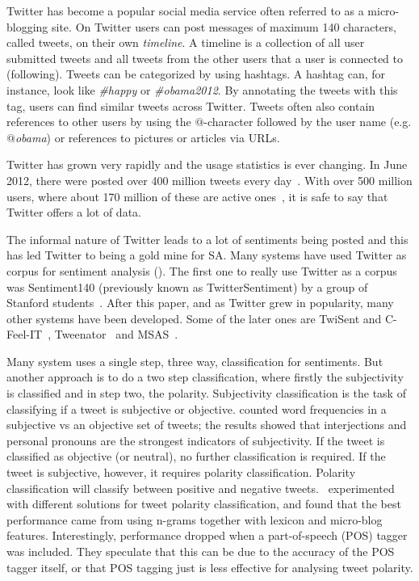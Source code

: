Twitter has become a popular social media service often referred to as a micro-blogging site. On Twitter users can post messages of maximum 140 characters, called tweets, on their own \emph{timeline}. A timeline is a collection of all user submitted tweets and all tweets from the other users that a user is connected to (following). Tweets can be categorized by using hashtags. A hashtag can, for instance, look like \emph{\#happy} or \emph{\#obama2012}. By annotating the tweets with this tag, users can find similar tweets across Twitter. Tweets often also contain references to other users by using the $@$-character followed by the user name (e.g. \emph{$@$obama}) or references to pictures or articles via URLs.

Twitter has grown very rapidly and the usage statistics is ever changing. In June 2012, there were posted over 400 million tweets every day~\citep{site:twitterusage}. With over 500 million users, where about 170 million of these are active ones~\citep{site:users}, it is safe to say that Twitter offers a lot of data.

The informal nature of Twitter leads to a lot of sentiments being posted and this has led Twitter to being a gold mine for SA. Many systems have used Twitter as corpus for sentiment analysis (). The first one to really use Twitter as a corpus was Sentiment140 (previously known as TwitterSentiment) by a group of Stanford students~\citep{article:go}. After this paper, and as Twitter grew in popularity, many other systems have been developed. Some of the later ones are TwiSent and C-Feel-IT~\citep{mukherjee2012twisent}, Tweenator~\citep{saif2012semantic} and MSAS~\citep{chamlertwat2012discovering}.

Many system uses a single step, three way, classification for sentiments. But another approach is to do a two step classification, where firstly the subjectivity is classified and in step two, the polarity. Subjectivity classification is the task of classifying if a tweet is subjective or objective. \cite{article:pak} counted word frequencies in a subjective vs an objective set of tweets; the results showed that interjections and personal pronouns are the strongest indicators of subjectivity. If the tweet is classified as objective (or neutral), no further classification is required. If the tweet is subjective, however, it requires polarity classification. Polarity classification will classify between positive and negative tweets.~\cite{article:omg} experimented with different solutions for tweet polarity classification, and found that the best performance came from using n-grams together with lexicon and micro-blog features. Interestingly, performance dropped when a part-of-speech (POS) tagger was included. They speculate that this can be due to the accuracy of the POS tagger itself, or that POS tagging just is less effective for analysing tweet polarity.

